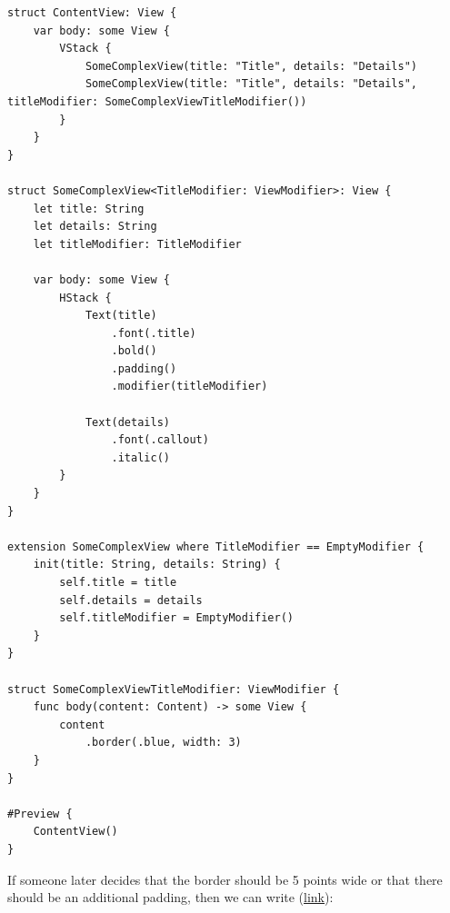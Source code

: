 \documentclass{article}
\begin{document}
\begin{lstlisting}
struct ContentView: View {
    var body: some View {
        VStack {
            SomeComplexView(title: "Title", details: "Details")
            SomeComplexView(title: "Title", details: "Details", titleModifier: SomeComplexViewTitleModifier())
        }
    }
}

struct SomeComplexView<TitleModifier: ViewModifier>: View {
    let title: String
    let details: String
    let titleModifier: TitleModifier

    var body: some View {
        HStack {
            Text(title)
                .font(.title)
                .bold()
                .padding()
                .modifier(titleModifier)

            Text(details)
                .font(.callout)
                .italic()
        }
    }
}

extension SomeComplexView where TitleModifier == EmptyModifier {
    init(title: String, details: String) {
        self.title = title
        self.details = details
        self.titleModifier = EmptyModifier()
    }
}

struct SomeComplexViewTitleModifier: ViewModifier {
    func body(content: Content) -> some View {
        content
            .border(.blue, width: 3)
    }
}

#Preview {
    ContentView()
}
\end{lstlisting}

If someone later decides that the border should be 5 points wide or that there should be an additional padding, then we can write (\href{https://github.com/stateman92/Medium-ViewModifier/commit/3b8bdc56922ce497241991c89314ab9f1f337e06}{link}):
\end{document}
